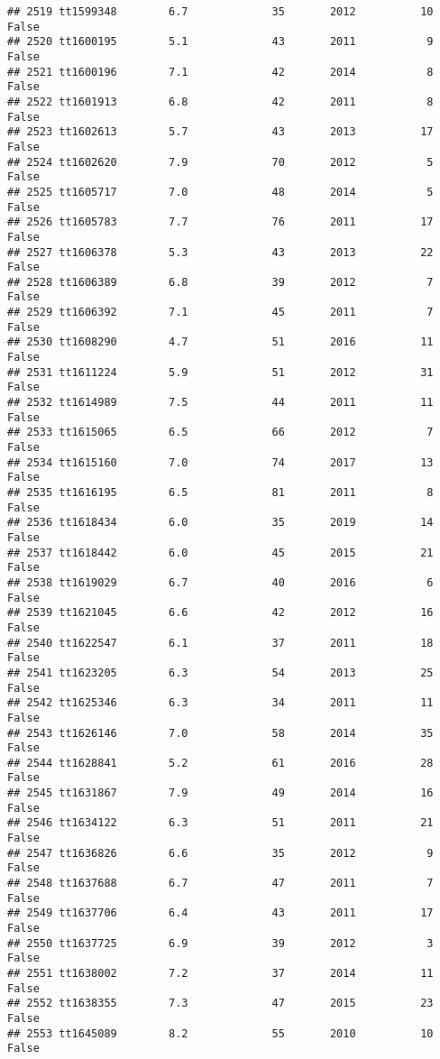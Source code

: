 \documentclass[
]{article}
\begin{document}
\begin{verbatim}
## 2519 tt1599348        6.7             35       2012          10   False
## 2520 tt1600195        5.1             43       2011           9   False
## 2521 tt1600196        7.1             42       2014           8   False
## 2522 tt1601913        6.8             42       2011           8   False
## 2523 tt1602613        5.7             43       2013          17   False
## 2524 tt1602620        7.9             70       2012           5   False
## 2525 tt1605717        7.0             48       2014           5   False
## 2526 tt1605783        7.7             76       2011          17   False
## 2527 tt1606378        5.3             43       2013          22   False
## 2528 tt1606389        6.8             39       2012           7   False
## 2529 tt1606392        7.1             45       2011           7   False
## 2530 tt1608290        4.7             51       2016          11   False
## 2531 tt1611224        5.9             51       2012          31   False
## 2532 tt1614989        7.5             44       2011          11   False
## 2533 tt1615065        6.5             66       2012           7   False
## 2534 tt1615160        7.0             74       2017          13   False
## 2535 tt1616195        6.5             81       2011           8   False
## 2536 tt1618434        6.0             35       2019          14   False
## 2537 tt1618442        6.0             45       2015          21   False
## 2538 tt1619029        6.7             40       2016           6   False
## 2539 tt1621045        6.6             42       2012          16   False
## 2540 tt1622547        6.1             37       2011          18   False
## 2541 tt1623205        6.3             54       2013          25   False
## 2542 tt1625346        6.3             34       2011          11   False
## 2543 tt1626146        7.0             58       2014          35   False
## 2544 tt1628841        5.2             61       2016          28   False
## 2545 tt1631867        7.9             49       2014          16   False
## 2546 tt1634122        6.3             51       2011          21   False
## 2547 tt1636826        6.6             35       2012           9   False
## 2548 tt1637688        6.7             47       2011           7   False
## 2549 tt1637706        6.4             43       2011          17   False
## 2550 tt1637725        6.9             39       2012           3   False
## 2551 tt1638002        7.2             37       2014          11   False
## 2552 tt1638355        7.3             47       2015          23   False
## 2553 tt1645089        8.2             55       2010          10   False

\end{verbatim}
\end{document}
